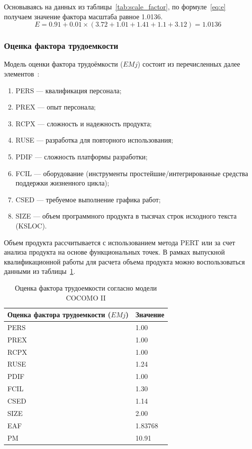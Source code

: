 Основываясь на данных из таблицы~\ref{tab:scale_factor}, по формуле~\ref{eq:e} получаем значение фактора масштаба равное 1.0136.
$$E = 0.91 + 0.01 \times (3.72 + 1.01 + 1.41 + 1.1 + 3.12) = 1.0136$$

\subsubsection{Оценка фактора трудоемкости}

Модель оценки фактора трудоёмкости ($EMj$) состоит из перечисленных далее элементов~\cite{bib:labor_f}:

\begin{enumerate}
    \item PERS --- квалификация персонала;
    \item PREX --- опыт персонала;
    \item RCPX --- сложность и надежность продукта;
    \item RUSE --- разработка для повторного использования;
    \item PDIF --- сложность платформы разработки;
    \item FCIL --- оборудование (инструменты простейшие/интегрированные средства поддержки жизненного цикла);
    \item CSED --- требуемое выполнение графика работ;
    \item SIZE --- объем программного продукта в тысячах строк исходного текста (KSLOC).
\end{enumerate}

Объем продукта рассчитывается с использованием метода PERT или за счет анализа продукта на основе функциональных точек. В рамках выпускной квалификационной работы для расчета объема продукта можно воспользоваться данными из таблицы~\ref{tab:labor_factor}.

\begin{table}[H]
    \caption{Оценка фактора трудоемкости согласно модели COCOMO II}
    \centering

    \emergencystretch=10pt
    \begin{tabular}{@{}ll@{}}
        \toprule
        \textbf{Оценка фактора трудоемкости ($EMj$)} & \textbf{Значение} \\
        \midrule
        PERS & 1.00 \\
        PREX & 1.00 \\
        RCPX & 1.00 \\
        RUSE & 1.24 \\
        PDIF & 1.00 \\
        FCIL & 1.30 \\
        CSED & 1.14 \\
        SIZE & 2.00 \\
        \midrule
        EAF & 1.83768 \\
        PM & 10.91 \\
        \bottomrule
    \end{tabular}
    \label{tab:labor_factor}
\end{table}

